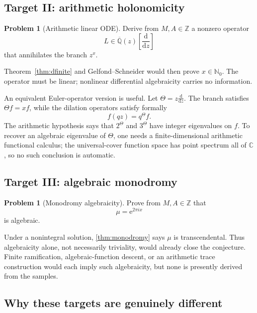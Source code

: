\documentclass[11pt,oneside]{article}
\theoremstyle{definition}
\newtheorem{problem}[theorem]{Problem}
\theoremstyle{remark}
\newcommand{\Nzero}{\mathbb N_0}
\newcommand{\Z}{\mathbb Z}
\newcommand{\C}{\mathbb C}
\newcommand{\Qbar}{\overline{\mathbb Q}}
\newcommand{\e}{\mathrm e}
\begin{document}
\subsection{Target II: arithmetic holonomicity}

\begin{problem}[Arithmetic linear ODE]
\label{prob:ODE}
Derive from \(M,A\in\Z\) a nonzero operator
\[
  L\in\Qbar(z)\left[\frac{\mathrm d}{\mathrm d z}\right]
\]
that annihilates the branch \(z^x\).
\end{problem}

Theorem~\ref{thm:dfinite} and Gelfond--Schneider would then prove \(x\in\Nzero\).  The operator must be linear; nonlinear differential algebraicity carries no information.

An equivalent Euler-operator version is useful.  Let \(\Theta=z\frac{\mathrm d}{\mathrm d z}\).  The branch satisfies \(\Theta f=xf\), while the dilation operators satisfy formally
\[
  f(qz)=q^\Theta f.
\]
The arithmetic hypothesis says that \(2^\Theta\) and \(3^\Theta\) have integer eigenvalues on \(f\).  To recover an algebraic eigenvalue of \(\Theta\), one needs a finite-dimensional arithmetic functional calculus; the universal-cover function space has point spectrum all of \(\C\), so no such conclusion is automatic.

\subsection{Target III: algebraic monodromy}

\begin{problem}[Monodromy algebraicity]
\label{prob:monodromy}
Prove from \(M,A\in\Z\) that
\[
  \mu=\e^{2\pi ix}
\]
is algebraic.
\end{problem}

Under a nonintegral solution, \cref{thm:monodromy} says \(\mu\) is transcendental.  Thus algebraicity alone, not necessarily triviality, would already close the conjecture.  Finite ramification, algebraic-function descent, or an arithmetic trace construction would each imply such algebraicity, but none is presently derived from the samples.

\subsection{Why these targets are genuinely different}
\end{document}
